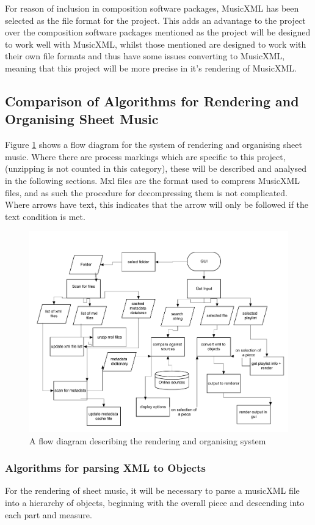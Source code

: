 For reason of inclusion in composition software packages, MusicXML has been selected as the file format for the project. This adds an advantage to the project over the composition software packages mentioned as the project will be designed to work well with MusicXML, whilst those mentioned are designed to work with their own file formats and thus have some issues converting to MusicXML\parencite{mscoreBugTracker}, meaning that this project will be more precise in it's rendering of MusicXML.


\subsection{Comparison of Algorithms for Rendering and Organising Sheet Music}
Figure \ref{fig:flow} shows a flow diagram for the system of rendering and organising sheet music. Where there are process markings which are specific to this project,(unzipping is not counted in this category), these will be described and analysed in the following sections.
Mxl files are the format used to compress MusicXML files, and as such the procedure for decompressing them is not complicated. Where arrows have text, this indicates that the arrow will only be followed if the text condition is met.
\begin{figure}[H]
    \centering
    \includegraphics[width=320pt]{flowchart}
    \caption{A flow diagram describing the rendering and organising system}
    \label{fig:flow}
\end{figure}

\subsubsection{Algorithms for parsing XML to Objects}
For the rendering of sheet music, it will be necessary to parse a musicXML file into a hierarchy of objects, beginning with the overall piece and descending into each part and measure. 

